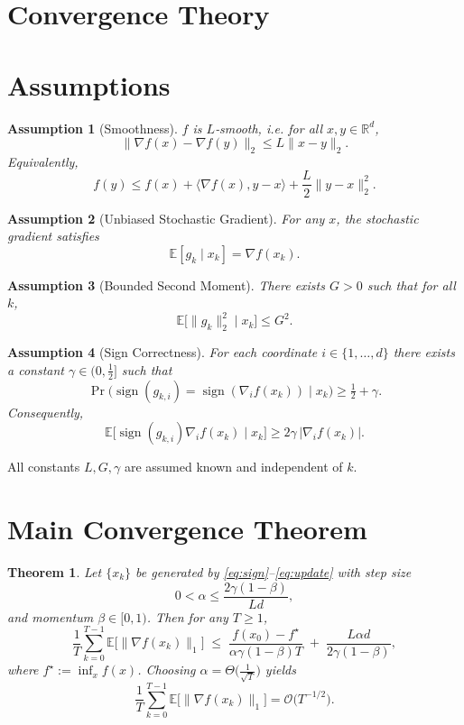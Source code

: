 \documentclass[11pt]{article}
\newtheorem{theorem}{Theorem}
\newtheorem{assumption}{Assumption}
\newcommand{\sign}{\operatorname{sign}}
\newcommand{\E}{\mathbb{E}}
\newcommand{\R}{\mathbb{R}}
\begin{document}
\section*{Convergence Theory}
\section{Assumptions}
\begin{assumption}[Smoothness]\label{ass:smooth}
$f$ is $L$‑smooth, i.e. for all $x,y\in\R^{d}$,
\[
\|\nabla f(x)-\nabla f(y)\|_2 \le L\|x-y\|_2 .
\]
Equivalently,
\[
f(y) \le f(x)+\langle\nabla f(x),y-x\rangle+\frac{L}{2}\|y-x\|_2^{2}.
\]
\end{assumption}

\begin{assumption}[Unbiased Stochastic Gradient]\label{ass:unbiased}
For any $x$, the stochastic gradient satisfies
\[
\E[g_k\mid x_k]=\nabla f(x_k).
\]
\end{assumption}

\begin{assumption}[Bounded Second Moment]\label{ass:boundedvar}
There exists $G>0$ such that for all $k$,
\[
\E\big[\|g_k\|_2^{2}\mid x_k\big]\le G^{2}.
\]
\end{assumption}

\begin{assumption}[Sign Correctness]\label{ass:sign}
For each coordinate $i\in\{1,\dots,d\}$ there exists a constant $\gamma\in(0,\tfrac12]$ such that
\[
\Pr\big(\sign(g_{k,i})=\sign(\nabla_i f(x_k))\mid x_k\big)\ge \tfrac12+\gamma .
\]
Consequently,
\[
\E\big[\sign(g_{k,i})\nabla_i f(x_k)\mid x_k\big]\ge 2\gamma\,|\nabla_i f(x_k)|.
\]
\end{assumption}

All constants $L,G,\gamma$ are assumed known and independent of $k$.

\section{Main Convergence Theorem}
\begin{theorem}\label{thm:main}
Let $\{x_k\}$ be generated by \eqref{eq:sign}–\eqref{eq:update} with step size
\[
0<\alpha\le\frac{2\gamma(1-\beta)}{L d},
\]
and momentum $\beta\in[0,1)$. Then for any $T\ge1$,
\[
\frac{1}{T}\sum_{k=0}^{T-1}\E\big[\|\nabla f(x_k)\|_{1}\big]
\;\le\;
\frac{f(x_0)-f^{\star}}{\alpha\gamma(1-\beta)T}
\;+\;
\frac{L\alpha d}{2\gamma(1-\beta)} ,
\]
where $f^{\star}:=\inf_{x}f(x)$. 
Choosing $\alpha = \Theta\!\big(\frac{1}{\sqrt{T}}\big)$ yields
\[
\frac{1}{T}\sum_{k=0}^{T-1}\E\big[\|\nabla f(x_k)\|_{1}\big]=\mathcal{O}\!\big(T^{-1/2}\big).
\]
\end{theorem}
\end{document}
